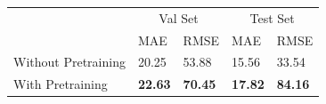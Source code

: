 \begin{tabular}{lllll}
\toprule
  & \multicolumn{2}{c}{Val Set} & \multicolumn{2}{c}{Test Set} \\
  & MAE & RMSE & MAE & RMSE
 \\
 \midrule
Without Pretraining & 20.25 & 53.88 & 15.56 & 33.54\\
With Pretraining & \textbf{22.63}  & \textbf{70.45} &  \textbf{17.82} & \textbf{84.16} \\


\bottomrule
\end{tabular}

 



